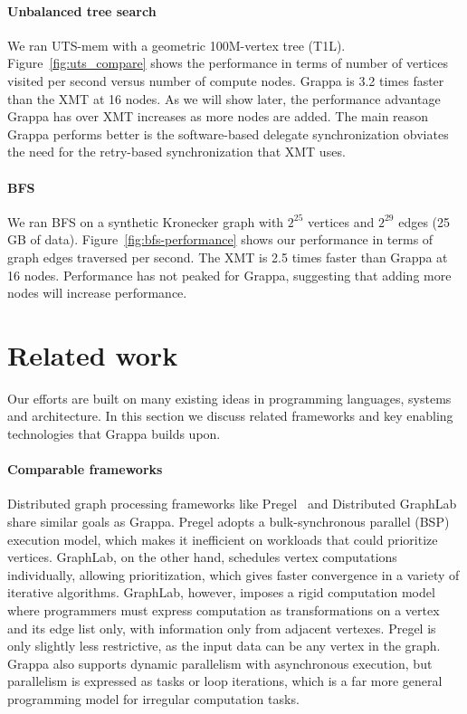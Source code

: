 \paragraph{Unbalanced tree search} We ran UTS-mem with a geometric 100M-vertex tree (T1L). Figure~\ref{fig:uts_compare} shows the performance in terms of number of vertices visited per second versus number of compute nodes. Grappa is 3.2 times faster than the XMT at 16 nodes.  As we will show later, the performance advantage Grappa has over XMT increases as more nodes are added.  The main reason Grappa performs better is the software-based delegate synchronization obviates the need for the retry-based synchronization that XMT uses.


\paragraph{BFS} We ran BFS on a synthetic Kronecker graph with $2^{25}$ vertices and $2^{29}$ edges (25 GB of data). Figure~\ref{fig:bfs-performance} shows our performance in terms of graph edges traversed per second. The XMT is 2.5 times faster than Grappa at 16 nodes.  Performance has not peaked for Grappa, suggesting that adding more nodes will increase performance.


\section{Related work}

Our efforts are built on many existing ideas in programming languages, systems and architecture. In this section we discuss related frameworks and key enabling technologies that Grappa builds upon.

\paragraph{Comparable frameworks} Distributed graph processing frameworks like Pregel~\cite{pregel:2010} and Distributed GraphLab~\cite{distgraphlab:vldb12} share similar goals as Grappa. Pregel adopts a bulk-synchronous parallel (BSP) execution model, which makes it inefficient on workloads that could prioritize vertices. GraphLab, on the other hand, schedules vertex computations individually, allowing prioritization, which gives faster convergence in a variety of iterative algorithms.  GraphLab, however, imposes a rigid computation model where programmers must express computation as transformations on a vertex and its edge list only, with information only from adjacent vertexes. Pregel is only slightly less restrictive, as the input data can be any vertex in the graph.  Grappa also supports dynamic parallelism with asynchronous execution, but parallelism is expressed as tasks or loop iterations, which is a far more general programming model for irregular computation tasks.

